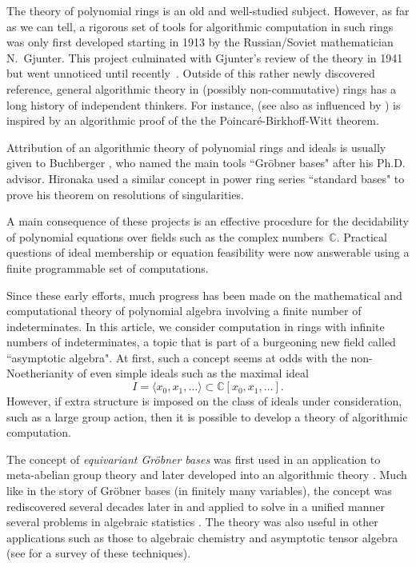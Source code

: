 
The theory of polynomial rings is an old and well-studied subject.  However, as far as we can tell, a rigorous set of tools for algorithmic computation in such rings was only first developed starting in 1913 \cite{gjunter1913} by the Russian/Soviet mathematician N.~Gjunter.  This project culminated with Gjunter's review of the theory in 1941 \cite{gunther1941modules} but went unnoticed until recently~\cite{renschuch2003contributions}.  Outside of this rather newly discovered reference, general algorithmic theory in (possibly non-commutative) rings has a long history of independent thinkers.  For instance, \cite{bergman1978diamond} (see also \cite{bokut1976embeddings} as influenced by \cite{shirshov1962some}) is inspired by an algorithmic proof of the the Poincar\'e-Birkhoff-Witt theorem.  

Attribution of an algorithmic theory of polynomial rings and ideals is usually given to Buchberger \cite{buchberger1965algorithmus}, who named the main tools ``Gr\"obner bases" after his Ph.D. advisor. Hironaka \cite{hironaka1964resolution} used a similar concept in power ring series ``standard bases" to prove his theorem on resolutions of singularities.  

A main consequence of these projects is an effective procedure for the decidability of polynomial equations over fields such as the complex numbers~$\mathbb{C}$.  Practical questions of ideal membership or equation feasibility were now answerable using a finite programmable set of computations.  

Since these early efforts, much progress has been made on the mathematical and computational theory of polynomial algebra involving a finite number of indeterminates.  In this article, we consider computation in rings with infinite numbers of indeterminates, a topic that is part of a burgeoning new field called ``asymptotic algebra".  At first, such a concept seems at odds with the non-Noetherianity of even simple ideals such as the maximal ideal \[I = \langle x_0, x_1, \ldots  \rangle \subset \mathbb C[x_0, x_1,\ldots].\]
However, if extra structure is imposed on the class of ideals under consideration, such as a large group action, then it is possible to develop a theory of algorithmic computation.  

The concept of \emph{equivariant Gr\"obner bases} was first used in an application to meta-abelian group theory \cite{cohen1967laws} and later developed into an algorithmic theory \cite{Emmott, Cohen87}. Much like in the story of Gr\"obner bases (in finitely many variables), the concept was rediscovered several decades later in \cite{aschenbrenner2007finite, aschenbrenner2008algorithm} and applied to solve in a unified manner several problems in algebraic statistics \cite{hillar2012finite}.  The theory was also useful in other applications such as those to algebraic chemistry \cite{Draisma08b} and asymptotic tensor algebra \cite{draisma2014bounded} (see \cite{draisma2014noetherianity} for a survey of these techniques).

